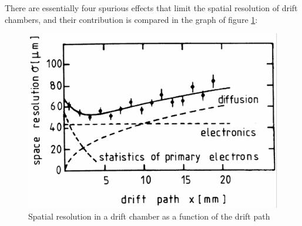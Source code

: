 \documentclass[a4paper,11pt]{book}
\begin{document}
There are essentially four spurious effects that limit the spatial resolution of drift chambers, and their contribution is compared in the graph of figure \ref{fig:drift_resolution}:
\begin{figure}[hbtp]
\centering
\includegraphics[scale=1]{pictures/drift_chamber_resolution.pdf}
\caption{Spatial resolution in a drift chamber as a function of the drift path}
\label{fig:drift_resolution}
\end{figure}
\end{document}
